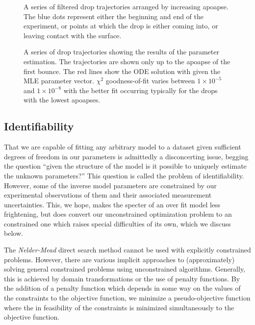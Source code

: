 \documentclass[12pt,a4paper,oneside]{book}
\begin{document}
\begin{figure}[h]
    \centering
    \resizebox{\textwidth}{!}{}
    \caption{A series of filtered drop trajectories arranged by increasing apoapse. The blue dots represent either the beginning and end of the experiment, or points at which the drop is either coming into, or leaving contact with the surface.}
    \label{fig:trajectories}
\end{figure}
\begin{figure}[h]
    \centering
    \resizebox{\textwidth}{!}{}
    \caption{A series of drop trajectories showing the results of the parameter estimation. The trajectories are shown only up to the apoapse of the first bounce. The red lines show the ODE solution with given the MLE parameter vector. $\chi^2$ goodness-of-fit varies between $1 \times 10^{-5}$ and $1 \times 10^{-8}$ with the better fit occurring typically for the drops with the lowest apoapses.}
    \label{fig:inverse_problem}
\end{figure}

\subsection{Identifiability}
That we are capable of fitting any arbitrary model to a dataset given sufficient degrees of freedom in our parameters is admittedly a disconcerting issue, begging the question ``given the structure of the model is it possible to uniquely estimate the unknown parameters?'' This question is called the problem of identifiability. However, some of the inverse model parameters are constrained by our experimental observations of them and their associated measurement uncertainties. This, we hope, makes the specter of an over fit model less frightening, but does convert our unconstrained optimization problem to an constrained one which raises special difficulties of its own, which we discuss below. 

The \emph{Nelder-Mead} direct search method cannot be used with explicitly constrained problems. However, there are various implicit approaches to (approximately) solving general constrained problems using unconstrained algorithms. Generally, this is achieved by domain transformations or the use of penalty functions.  By the addition of a penalty function which depends in some way on the values of the constraints to the objective function, we minimize a pseudo-objective function where the in feasibility of the constraints is minimized simultaneously to the objective function. 
\end{document}

